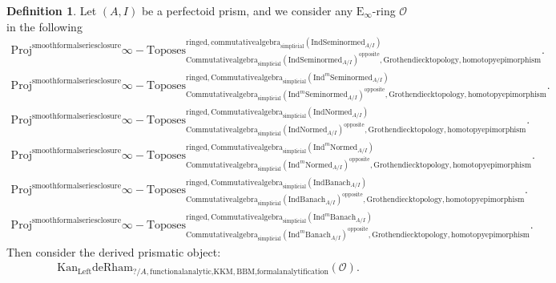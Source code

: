 \documentclass[11pt]{book}
\theoremstyle{definition}
\newtheorem{definition}[theorem]{Definition}
\numberwithin{equation}{section}
\begin{document}
\begin{definition}
Let $(A,I)$ be a perfectoid prism, and we consider any $\mathrm{E}_\infty$-ring $\mathcal{O}$ in the following
\begin{align}
\mathrm{Proj}^\text{smoothformalseriesclosure}\infty-\mathrm{Toposes}^{\mathrm{ringed},\mathrm{commutativealgebra}_{\mathrm{simplicial}}(\mathrm{Ind}\mathrm{Seminormed}_{A/I})}_{\mathrm{Commutativealgebra}_{\mathrm{simplicial}}(\mathrm{Ind}\mathrm{Seminormed}_{A/I})^\mathrm{opposite},\mathrm{Grothendiecktopology,homotopyepimorphism}}. \\
\mathrm{Proj}^\text{smoothformalseriesclosure}\infty-\mathrm{Toposes}^{\mathrm{ringed},\mathrm{Commutativealgebra}_{\mathrm{simplicial}}(\mathrm{Ind}^m\mathrm{Seminormed}_{A/I})}_{\mathrm{Commutativealgebra}_{\mathrm{simplicial}}(\mathrm{Ind}^m\mathrm{Seminormed}_{A/I})^\mathrm{opposite},\mathrm{Grothendiecktopology,homotopyepimorphism}}.\\
\mathrm{Proj}^\text{smoothformalseriesclosure}\infty-\mathrm{Toposes}^{\mathrm{ringed},\mathrm{Commutativealgebra}_{\mathrm{simplicial}}(\mathrm{Ind}\mathrm{Normed}_{A/I})}_{\mathrm{Commutativealgebra}_{\mathrm{simplicial}}(\mathrm{Ind}\mathrm{Normed}_{A/I})^\mathrm{opposite},\mathrm{Grothendiecktopology,homotopyepimorphism}}.\\
\mathrm{Proj}^\text{smoothformalseriesclosure}\infty-\mathrm{Toposes}^{\mathrm{ringed},\mathrm{Commutativealgebra}_{\mathrm{simplicial}}(\mathrm{Ind}^m\mathrm{Normed}_{A/I})}_{\mathrm{Commutativealgebra}_{\mathrm{simplicial}}(\mathrm{Ind}^m\mathrm{Normed}_{A/I})^\mathrm{opposite},\mathrm{Grothendiecktopology,homotopyepimorphism}}.\\
\mathrm{Proj}^\text{smoothformalseriesclosure}\infty-\mathrm{Toposes}^{\mathrm{ringed},\mathrm{Commutativealgebra}_{\mathrm{simplicial}}(\mathrm{Ind}\mathrm{Banach}_{A/I})}_{\mathrm{Commutativealgebra}_{\mathrm{simplicial}}(\mathrm{Ind}\mathrm{Banach}_{A/I})^\mathrm{opposite},\mathrm{Grothendiecktopology,homotopyepimorphism}}.\\
\mathrm{Proj}^\text{smoothformalseriesclosure}\infty-\mathrm{Toposes}^{\mathrm{ringed},\mathrm{Commutativealgebra}_{\mathrm{simplicial}}(\mathrm{Ind}^m\mathrm{Banach}_{A/I})}_{\mathrm{Commutativealgebra}_{\mathrm{simplicial}}(\mathrm{Ind}^m\mathrm{Banach}_{A/I})^\mathrm{opposite},\mathrm{Grothendiecktopology,homotopyepimorphism}}. 
\end{align}
Then consider the derived prismatic object:
\begin{align}
\mathrm{Kan}_{\mathrm{Left}}\mathrm{deRham}_{?/A,\text{functionalanalytic,KKM},\text{BBM,formalanalytification}}(\mathcal{O}).

\end{align}
\end{definition}
\end{document}
